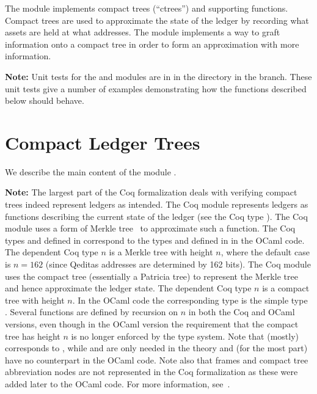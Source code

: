 The {} module
implements compact trees (``ctrees'')
and supporting functions.
Compact trees are used to approximate the state of the ledger
by recording what assets are held at what addresses.
The {} module
implements a way to graft information onto a compact
tree in order to form an approximation with more information.

{\bf{Note:}} Unit tests for the {} and {} modules are in {}
in the {}
directory in the {} branch.
These unit tests give a number of examples demonstrating how the functions described below should behave.

\section{Compact Ledger Trees}

We describe the main content of the module {}.

{\bf{Note:}} The largest part of the Coq formalization deals with verifying compact trees
indeed represent ledgers as intended.
The Coq module {} represents ledgers as functions
describing the current state of the ledger (see the Coq type ).
The Coq module {} uses a form of Merkle tree~\cite{Merkle1980} to approximate such a
{} function.
The Coq types {} and {} defined in {} correspond to 
the types {} and {} defined in {} in the OCaml code.
The dependent Coq type {} $n$ is a Merkle tree with height $n$,
where the default case is $n=162$ (since Qeditas addresses are determined by 162 bits).
The Coq module {} uses the compact tree (essentially a Patricia tree)
to represent the Merkle tree and hence approximate the ledger state.
The dependent Coq type {} $n$ is a compact tree with height $n$.
In the OCaml code the corresponding type is the simple type {}.
Several functions are defined by recursion on $n$ in both the Coq and OCaml versions,
even though in the OCaml version the requirement that the compact tree has height $n$
is no longer enforced by the type system.
Note that {} (mostly) corresponds to {},
while {} and {} are only needed in the theory
and (for the most part) have no counterpart in the OCaml code.
Note also that frames and compact tree abbreviation nodes are not
represented in the Coq formalization as these were added later to the
OCaml code.
For more information, see~\cite{White2015b}.

